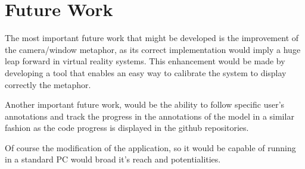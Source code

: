 \section{Future Work}
The most important future work that might be developed is the improvement of the camera/window metaphor, as its correct implementation would imply a huge leap forward in virtual reality systems. This enhancement would be made by developing a tool that enables an easy way to calibrate the system to display correctly the metaphor.

Another important future work, would be the ability to follow specific user's annotations and track the progress in the annotations of the model in a similar fashion as the code progress is displayed in the github repositories.

Of course the modification of the application, so it would be capable of running in a standard PC would broad it's reach and potentialities.